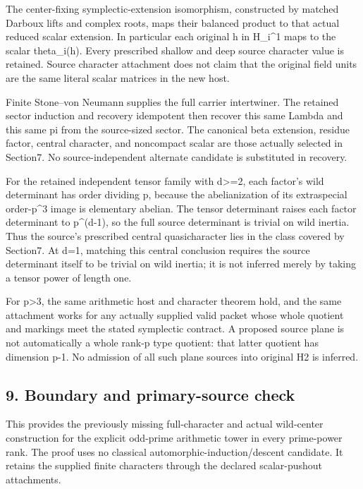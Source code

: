 The center-fixing symplectic-extension isomorphism, constructed by
matched Darboux lifts and complex roots, maps their balanced product to
that actual reduced scalar extension. In particular each original h in
H\_i\^{}1 maps to the scalar theta\_i(h). Every prescribed shallow and
deep source character value is retained. Source character attachment
does not claim that the original field units are the same literal scalar
matrices in the new host.

Finite Stone--von Neumann supplies the full carrier intertwiner. The
retained sector induction and recovery idempotent then recover this same
Lambda and this same pi from the source-sized sector. The canonical beta
extension, residue factor, central character, and noncompact scalar are
those actually selected in Section7. No source-independent alternate
candidate is substituted in recovery.

For the retained independent tensor family with d\textgreater=2, each
factor's wild determinant has order dividing p, because the
abelianization of its extraspecial order-p\^{}3 image is elementary
abelian. The tensor determinant raises each factor determinant to
p\^{}(d-1), so the full source determinant is trivial on wild inertia.
Thus the source's prescribed central quasicharacter lies in the class
covered by Section7. At d=1, matching this central conclusion requires
the source determinant itself to be trivial on wild inertia; it is not
inferred merely by taking a tensor power of length one.

For p\textgreater3, the same arithmetic host and character theorem hold,
and the same attachment works for any actually supplied valid packet
whose whole quotient and markings meet the stated symplectic contract. A
proposed source plane is not automatically a whole rank-p type quotient:
that latter quotient has dimension p-1. No admission of all such plane
sources into original H2 is inferred.

\hypertarget{odd_character-boundary-and-primary-source-check}{%
\subsection{9. Boundary and primary-source
check}\label{odd_character-boundary-and-primary-source-check}}

This provides the previously missing full-character and actual
wild-center construction for the explicit odd-prime arithmetic tower in
every prime-power rank. The proof uses no classical
automorphic-induction/descent candidate. It retains the supplied finite
characters through the declared scalar-pushout attachments.

